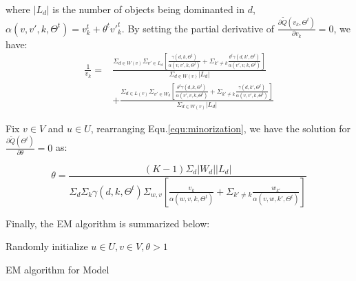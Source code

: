\documentclass{sig-alternate}
\begin{document}
where $|L_d|$ is the number of objects being dominanted in $d$, $\alpha(v,v',k,\Theta^t)=v_k^t + \theta^t {v'}_k^t$. By setting the partial derivative of $\frac{\partial \tilde{Q}(v_k,\Theta^t)}{\partial v_k}=0$, we have:
\begin{align}\label{equ:v}
\frac{1}{v_k}= &\frac{\Sigma_{d\in W(v)}\Sigma_{v'\in L_d} [\frac{\gamma(d,k,\Theta^t)}{ \alpha(v,v',k,\Theta^t)} +\Sigma_{k'\neq k}\frac{\theta^t\gamma(d,k',\Theta^t)}{\alpha(v',v,k,\Theta^t)}]}{\Sigma_{d\in W(v)}|L_d|}\\\nonumber
 & + \frac{\Sigma_{d\in L(v)}\Sigma_{v'\in W_d} [\frac{\theta^t \gamma(d,k,\Theta^t)}{\alpha(v',v,k,\Theta^t)}+\Sigma_{k'\neq k} \frac{\gamma(d,k',\Theta^t)}{\alpha(v,v',k,\Theta^t)}] }{\Sigma_{d\in W(v)}|L_d|}
\end{align}

Fix $v \in V$ and $u \in U$, rearranging Equ.\ref{equ:minorization}, we have the solution for $\frac{\partial \tilde{Q}(\Theta^t)}{\partial \theta}=0$ as:

\begin{equation}\label{equ:theta}
\theta = \frac{(K-1)\Sigma_d |W_d| |L_d|}{\Sigma_d \Sigma_k \gamma(d,k,\Theta^t)\Sigma_{w,v} [\frac{v_k}{\alpha(w,v,k,\Theta^t)}+\Sigma_{k'\neq k} \frac{w_{k'}}{\alpha(v,w,k',\Theta^t)}]}
\end{equation}

Finally, the EM algorithm is summarized below:

\begin{algorithm}
Randomly initialize $u \in U, v \in V, \theta >1$\;

\;
\caption{EM algorithm for Model}
\label{algo:EM}
\end{algorithm}
\end{document}
